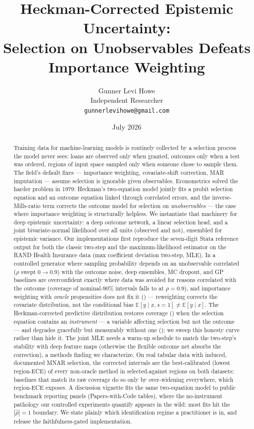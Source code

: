 \documentclass[10pt]{article}
\title{Heckman-Corrected Epistemic Uncertainty:\\
Selection on Unobservables Defeats Importance Weighting}
\author{Gunner Levi Howe\\
Independent Researcher\\
\texttt{gunnerlevihowe@gmail.com}}
\date{July 2026}
\newcommand{\E}{\mathbb{E}}
\begin{document}
\maketitle

\begin{abstract}
Training data for machine-learning models is routinely collected by a
selection process the model never sees: loans are observed only when
granted, outcomes only when a test was ordered, regions of input space
sampled only when someone chose to sample them. The field's default fixes
--- importance weighting, covariate-shift correction, MAR imputation ---
assume selection is ignorable given observables. Econometrics solved the
harder problem in 1979: Heckman's two-equation model jointly fits a probit
selection equation and an outcome equation linked through correlated
errors, and the inverse-Mills-ratio term corrects the outcome model for
selection on \emph{unobservables} --- the case where importance weighting
is structurally helpless. We instantiate that machinery for deep epistemic
uncertainty: a deep outcome network, a linear selection head, and a joint
bivariate-normal likelihood over all units (observed and not), ensembled
for epistemic variance. Our implementations first reproduce the
seven-digit Stata reference output for both the classic two-step and the
maximum-likelihood estimator on the RAND Health Insurance data (max
coefficient deviation \EZeroDevTS{} two-step, \EZeroDevMLE{} MLE). In a
controlled generator where sampling probability depends on an unobservable
correlated ($\rho$ swept $0\to0.9$) with the outcome noise, deep
ensembles, MC dropout, and GP baselines are overconfident exactly where
data was avoided for reasons correlated with the outcome (coverage of
nominal-90\% intervals falls to \CovAgEnsHi{} at $\rho=0.9$), and
importance weighting with \emph{oracle} propensities does not fix it
(\CovAgIWHi{}) --- reweighting corrects the covariate distribution, not
the conditional bias $\E[y \mid x, s{=}1] \neq \E[y \mid x]$. The
Heckman-corrected predictive distribution restores coverage
(\CovAgHeckTSHi{}) when the selection equation contains an
\emph{instrument} --- a variable affecting selection but not the outcome
--- and degrades gracefully but measurably without one (\CovAgHeckTSHiNoInstr{}); we
sweep this honesty curve rather than hide it. The joint MLE needs a
warm-up schedule to match the two-step's stability with deep feature maps
(otherwise the flexible outcome net absorbs the correction), a methods
finding we characterize. On real tabular data with induced, documented MNAR
selection, the corrected intervals are the best-calibrated (lowest
region-ECE) of every non-oracle method in selected-against regions on both
datasets; baselines that match its raw coverage do so only by over-widening
everywhere, which region-ECE exposes. A discussion vignette fits the same
two-equation model to public benchmark reporting panels (Papers-with-Code
tables), where the no-instrument pathology our controlled experiments
quantify appears in the wild: most fits hit the $|\hat\rho|=1$ boundary.
We state plainly which identification regime a practitioner is in, and
release the faithfulness-gated implementation.
\end{abstract}
\end{document}
